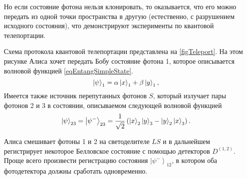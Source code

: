 Но если состояние фотона нельзя клонировать, то оказывается, что его
можно передать из одной точки пространства в другую  
(естественно, с разрушением исходного состояния), что
демонстрируют эксперименты по квантовой телепортации. 



Схема протокола квантовой телепортации представлена на 
\autoref{figTeleport}. На этом рисунке Алиса хочет передать Бобу  
состояние фотона 1, которое описывается волновой функцией
\eqref{eqEntangSimpleState}. 
\[
\left|\psi\right>_1 = \alpha \ket{x}_1 +
\beta \ket{y}_1, 
\]
Имеется также источник перепутанных фотонов $S$, который излучает пары
фотонов 2 и 3 в состоянии, описываемом следующей волновой функцией 
\begin{equation}
  \left|\psi\right>_{23} = \left|\psi^{-}\right>_{23} = \frac{1}{\sqrt{2}}\left(
  \ket{x}_2\ket{y}_3 - 
  \ket{y}_2\ket{x}_3
  \right).
  \nonumber
\end{equation}

Алиса смешивает фотоны 1 и 2 на светоделителе $LS$ и в дальнейшем
регистрирует некоторое Белловское состояние с помощью детекторов
$D^{(1,2)}$. Проще всего произвести регистрацию состояния
$\left|\psi^{-}\right>_{12}$, в котором оба фотодетектора должны
сработать одновременно.

